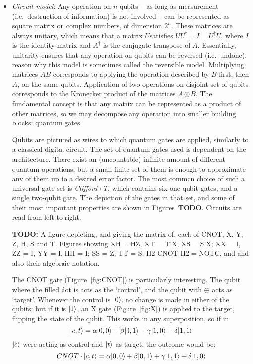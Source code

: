 \begin{itemize}

  \item \textit{Circuit model}: Any operation on \(n\) qubits -- as long as measurement (i.e.\ destruction of information) is not involved -- can be represented as square matrix on complex numbers, of dimension \(2^n\). These matrices are always unitary, which means that a matrix \(U\)satisfies \(UU^\dag = I = U^\dag U\), where \(I\) is the identity matrix and \(A^\dag\) is the conjugate transpose of \(A\). Essentially, unitarity ensures that any operation on qubits can be reversed (i.e.\ undone), reason why this model is sometimes called the reversible model. Multiplying matrices \(AB\) corresponds to applying the operation described by \(B\) first, then \(A\), on the same qubits. Application of two operations on disjoint set of qubits corresponds to the Kronecker product of the matrices \(A \otimes B\). The fundamental concept is that any matrix can be represented as a product of other matrices, so we may decompose any operation into smaller building blocks: quantum gates.

  Qubits are pictured as wires to which quantum gates are applied, similarly to a classical digital circuit. The set of quantum gates used is dependent on the architecture. There exist an (uncountable) infinite amount of different quantum operations, but a small finite set of them is enough to approximate any of them up to a desired error factor. The most common choice of such a universal gate-set is \textit{Clifford+T}, which contains six one-qubit gates, and a single two-qubit gate. The depiction of the gates in that set, and some of their most important properties are shown in Figures~\textbf{TODO}. Circuits are read from left to right.

  \textbf{TODO:} A figure depicting, and giving the matrix of, each of CNOT, X, Y, Z, H, S and T. Figures showing XH = HZ, XT = T'X, XS = S'X; XX = I, ZZ = I, YY = I, HH = I; SS = Z; TT = S; H2 CNOT H2 = NOTC, and  and also their algebraic notation.

  

  The CNOT gate (Figure~\ref{fig:CNOT}) is particularly interesting. The qubit where the filled dot is acts as the `control', and the qubit with \(\oplus\) acts as `target'. Whenever the control is \(\vert 0 \rangle\), no change is made in either of the qubits; but if it is \(\vert 1 \rangle\), an X gate (Figure~\ref{fig:X}) is applied to the target, flipping the state of the qubit. This works in any superposition, so if in \[\vert c,t \rangle = \alpha\vert 0,0 \rangle + \beta\vert 0,1 \rangle + \gamma\vert 1,0 \rangle + \delta\vert 1,1 \rangle\] \(\vert c \rangle\) were acting as control and \(\vert t \rangle\) as target, the outcome would be: \[CNOT \cdot \vert c,t \rangle = \alpha\vert 0,0 \rangle + \beta\vert 0,1 \rangle + \gamma\vert 1,1 \rangle + \delta\vert 1,0 \rangle\]


\end{itemize}
